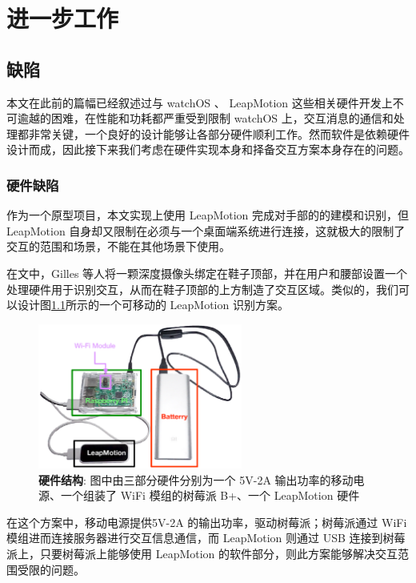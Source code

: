 \chapter{进一步工作}

\section{缺陷}

本文在此前的篇幅已经叙述过与 watchOS 、 LeapMotion 这些相关硬件开发上不可逾越的困难，在性能和功耗都严重受到限制 watchOS 上，交互消息的通信和处理都非常关键，一个良好的设计能够让各部分硬件顺利工作。然而软件是依赖硬件设计而成，因此接下来我们考虑在硬件实现本身和择备交互方案本身存在的问题。

\subsection{硬件缺陷}

作为一个原型项目，本文实现上使用 LeapMotion 完成对手部的的建模和识别，但 LeapMotion 自身却又限制在必须与一个桌面端系统进行连接，这就极大的限制了交互的范围和场景，不能在其他场景下使用。

在文\cite{Bailly:2012:SNP:2207676.2208576}中，Gilles 等人将一颗深度摄像头绑定在鞋子顶部，并在用户和腰部设置一个处理硬件用于识别交互，从而在鞋子顶部的上方制造了交互区域。类似的，我们可以设计图\ref{fig:hardware}所示的一个可移动的 LeapMotion 识别方案。

\begin{figure}[H]
    \kaishu
    \centering
    \includegraphics[width=0.6\textwidth]{figures/hardware}
    \caption{\kaishu \textbf{硬件结构}: 图中由三部分硬件分别为一个 5V-2A 输出功率的移动电源、一个组装了 WiFi 模组的树莓派 B+、一个 LeapMotion 硬件}
    \label{fig:hardware}
\end{figure}

在这个方案中，移动电源提供5V-2A 的输出功率，驱动树莓派；树莓派通过 WiFi 模组进而连接服务器进行交互信息通信，而 LeapMotion 则通过 USB 连接到树莓派上，只要树莓派上能够使用 LeapMotion 的软件部分，则此方案能够解决交互范围受限的问题。

